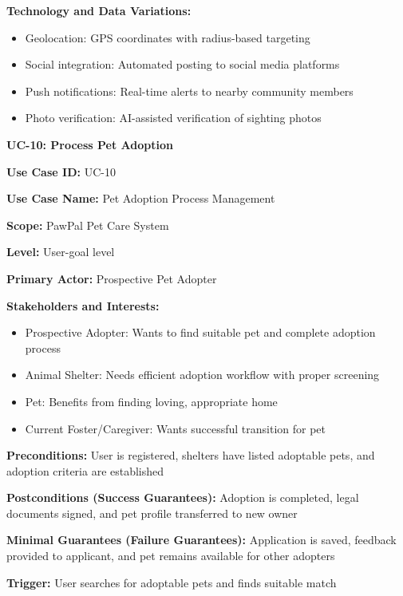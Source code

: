 \textbf{Technology and Data Variations:}
\begin{itemize}
    \item Geolocation: GPS coordinates with radius-based targeting
    \item Social integration: Automated posting to social media platforms
    \item Push notifications: Real-time alerts to nearby community members
    \item Photo verification: AI-assisted verification of sighting photos
\end{itemize}

\textbf{UC-10: Process Pet Adoption}

\textbf{Use Case ID:} UC-10

\textbf{Use Case Name:} Pet Adoption Process Management

\textbf{Scope:} PawPal Pet Care System

\textbf{Level:} User-goal level

\textbf{Primary Actor:} Prospective Pet Adopter

\textbf{Stakeholders and Interests:}
\begin{itemize}
    \item Prospective Adopter: Wants to find suitable pet and complete adoption process
    \item Animal Shelter: Needs efficient adoption workflow with proper screening
    \item Pet: Benefits from finding loving, appropriate home
    \item Current Foster/Caregiver: Wants successful transition for pet
\end{itemize}

\textbf{Preconditions:} User is registered, shelters have listed adoptable pets, and adoption criteria are established

\textbf{Postconditions (Success Guarantees):} Adoption is completed, legal documents signed, and pet profile transferred to new owner

\textbf{Minimal Guarantees (Failure Guarantees):} Application is saved, feedback provided to applicant, and pet remains available for other adopters

\textbf{Trigger:} User searches for adoptable pets and finds suitable match

